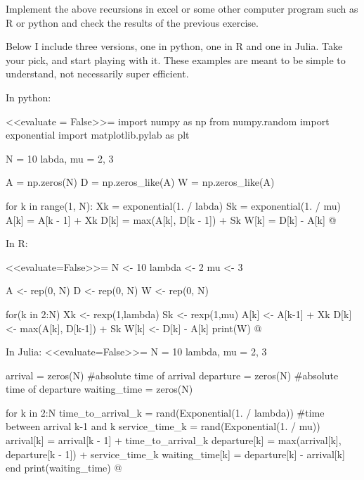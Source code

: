 \begin{question}
  Implement the above recursions in excel or some other computer
  program such as R or python and check the results of the previous
  exercise.
    \begin{solution}
      Below I include three versions, one in python, one in R and one
      in Julia. Take your pick, and start playing with it. These
      examples are meant to be simple to understand, not necessarily
      super efficient.  

In python:

<<evaluate =  False>>=
import numpy as np
from numpy.random import exponential
import matplotlib.pylab as plt

N = 10
labda, mu = 2, 3

A = np.zeros(N)
D = np.zeros_like(A)
W = np.zeros_like(A)

for k in range(1, N):
    Xk = exponential(1. / labda)
    Sk = exponential(1. / mu)
    A[k] = A[k - 1] + Xk
    D[k] = max(A[k], D[k - 1]) + Sk
    W[k] = D[k] - A[k]
@
  
In R: 

<<evaluate=False>>=
N <- 10
lambda <- 2
mu <- 3

A <- rep(0, N)
D <- rep(0, N)
W <- rep(0, N)

for(k in 2:N){
  Xk <- rexp(1,lambda)
  Sk <- rexp(1,mu)
  A[k] <- A[k-1] + Xk
  D[k] <- max(A[k], D[k-1]) + Sk
  W[k] <- D[k] - A[k]
}
print(W)
@

In Julia:
<<evaluate=False>>=
N = 10
lambda, mu = 2, 3

arrival = zeros(N) #absolute time of arrival
departure = zeros(N) #absolute time of departure
waiting_time = zeros(N)

for k in 2:N
    time_to_arrival_k = rand(Exponential(1. / lambda)) #time between arrival k-1 and k
    service_time_k = rand(Exponential(1. / mu))
    arrival[k] = arrival[k - 1] + time_to_arrival_k
    departure[k] = max(arrival[k], departure[k - 1]) + service_time_k
    waiting_time[k] = departure[k] - arrival[k]
end
print(waiting_time)
@

\end{solution}
\end{question}

